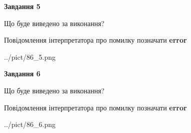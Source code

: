 \documentclass[12pt, ukrainian]{article}
\begin{document}
{{\begin {center}\textbf{Завдання 5}\end {center}}\par
Що буде виведено за виконання? \par
Повідомлення інтерпретатора про помилку позначати \textbf{error}

\begin{center}
	{../pict/86_5.png}
\end{center}
\newpage

{\begin {center}\textbf{Завдання 6}\end {center}}\par
Що буде виведено за виконання? \par
Повідомлення інтерпретатора про помилку позначати \textbf{error}

\begin{center}
	{../pict/86_6.png}
\end{center}
\newpage

}
\end{document}
